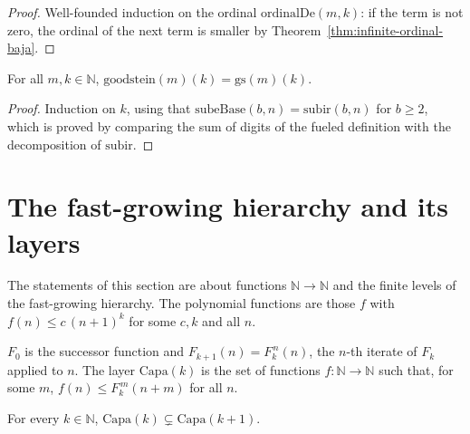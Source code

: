 \begin{proof}
  \leanok
  Well-founded induction on the ordinal $\mathrm{ordinalDe}(m, k)$: if the term is not zero, the ordinal of the next
  term is smaller by Theorem~\ref{thm:infinite-ordinal-baja}.
\end{proof}

\begin{theorem}
  \label{thm:infinite-goodstein-eq-gs}
  \leanok
  For all $m, k \in \mathbb{N}$, $\mathrm{goodstein}(m)(k) = \mathrm{gs}(m)(k)$.
\end{theorem}

\begin{proof}
  \leanok
  Induction on $k$, using that $\mathrm{subeBase}(b, n) = \mathrm{subir}(b, n)$ for $b \ge 2$, which is proved by
  comparing the sum of digits of the fueled definition with the decomposition of $\mathrm{subir}$.
\end{proof}

\section{The fast-growing hierarchy and its layers}
\label{sec:infinite-hierarchy}

The statements of this section are about functions $\mathbb{N} \to \mathbb{N}$ and the finite levels of the
fast-growing hierarchy. The polynomial functions are those $f$ with $f(n) \le c\,(n+1)^k$ for some $c, k$ and all $n$.

\begin{definition}
  \label{def:infinite-F-capa}
  \leanok
  \own{}
  $F_0$ is the successor function and $F_{k+1}(n) = F_k^{\,n}(n)$, the $n$-th iterate of $F_k$ applied to $n$. The layer
  $\mathrm{Capa}(k)$ is the set of functions $f : \mathbb{N} \to \mathbb{N}$ such that, for some $m$, $f(n) \le F_k^{\,m}(n + m)$
  for all $n$.
\end{definition}

\begin{theorem}
  \label{thm:infinite-capa-estricta}
  \leanok
  For every $k \in \mathbb{N}$, $\mathrm{Capa}(k) \subsetneq \mathrm{Capa}(k+1)$.
\end{theorem}

